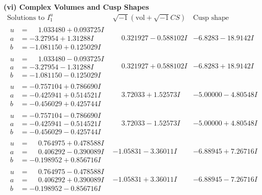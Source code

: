 \documentclass[1p]{elsarticle_modified}
\theoremstyle{definition}
\newcommand{\I}{\sqrt{-1}}
\begin{document}
\newpage\flushleft \textbf{(vi) Complex Volumes and Cusp Shapes}
$$\begin{array}{c|c|c}  
\text{Solutions to }I^u_{1}& \I (\text{vol} + \sqrt{-1}CS) & \text{Cusp shape}\\
 \hline 
\begin{aligned}
u &= \phantom{-}1.033480 + 0.093725 I \\
a &= -3.27954 + 1.31288 I \\
b &= -1.081150 + 0.125029 I\end{aligned}
 & \phantom{-}0.321927 - 0.588102 I & -6.8283 - 18.9142 I \\ \hline\begin{aligned}
u &= \phantom{-}1.033480 - 0.093725 I \\
a &= -3.27954 - 1.31288 I \\
b &= -1.081150 - 0.125029 I\end{aligned}
 & \phantom{-}0.321927 + 0.588102 I & -6.8283 + 18.9142 I \\ \hline\begin{aligned}
u &= -0.757104 + 0.786690 I \\
a &= -0.425941 + 0.514521 I \\
b &= -0.456029 + 0.425744 I\end{aligned}
 & \phantom{-}3.72033 + 1.52573 I & -5.00000 - 4.80548 I \\ \hline\begin{aligned}
u &= -0.757104 - 0.786690 I \\
a &= -0.425941 - 0.514521 I \\
b &= -0.456029 - 0.425744 I\end{aligned}
 & \phantom{-}3.72033 - 1.52573 I & -5.00000 + 4.80548 I \\ \hline\begin{aligned}
u &= \phantom{-}0.764975 + 0.478588 I \\
a &= \phantom{-}0.406292 - 0.390089 I \\
b &= -0.198952 + 0.856716 I\end{aligned}
 & -1.05831 - 3.36011 I & -6.88945 + 7.26716 I \\ \hline\begin{aligned}
u &= \phantom{-}0.764975 - 0.478588 I \\
a &= \phantom{-}0.406292 + 0.390089 I \\
b &= -0.198952 - 0.856716 I\end{aligned}
 & -1.05831 + 3.36011 I & -6.88945 - 7.26716 I \\ \hline\begin{aligned}

\end{aligned}
\end{array}$$
\end{document}
